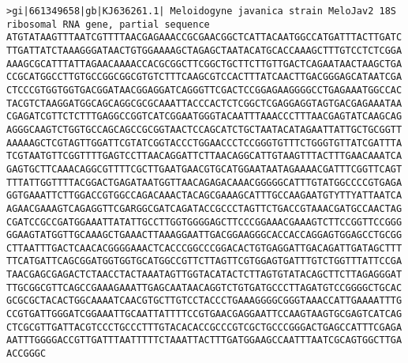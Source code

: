 \documentclass[11pt]{article}
\begin{document}
\begin{Verbatim}[commandchars=\\\{\}]
>gi|661349658|gb|KJ636261.1| Meloidogyne javanica strain MeloJav2 18S ribosomal RNA gene, partial sequence
ATGTATAAGTTTAATCGTTTTAACGAGAAACCGCGAACGGCTCATTACAATGGCCATGATTTACTTGATC
TTGATTATCTAAAGGGATAACTGTGGAAAAGCTAGAGCTAATACATGCACCAAAGCTTTGTCCTCTCGGA
AAAGCGCATTTATTAGAACAAAACCACGCGGCTTCGGCTGCTTCTTGTTGACTCAGAATAACTAAGCTGA
CCGCATGGCCTTGTGCCGGCGGCGTGTCTTTCAAGCGTCCACTTTATCAACTTGACGGGAGCATAATCGA
CTCCCGTGGTGGTGACGGATAACGGAGGATCAGGGTTCGACTCCGGAGAAGGGGCCTGAGAAATGGCCAC
TACGTCTAAGGATGGCAGCAGGCGCGCAAATTACCCACTCTCGGCTCGAGGAGGTAGTGACGAGAAATAA
CGAGATCGTTCTCTTTGAGGCCGGTCATCGGAATGGGTACAATTTAAACCCTTTAACGAGTATCAAGCAG
AGGGCAAGTCTGGTGCCAGCAGCCGCGGTAACTCCAGCATCTGCTAATACATAGAATTATTGCTGCGGTT
AAAAAGCTCGTAGTTGGATTCGTATCGGTACCCTGGAACCCTCCGGGTGTTTCTGGGTGTTATCGATTTA
TCGTAATGTTCGGTTTTGAGTCCTTAACAGGATTCTTAACAGGCATTGTAAGTTTACTTTGAACAAATCA
GAGTGCTTCAAACAGGCGTTTTCGCTTGAATGAACGTGCATGGAATAATAGAAAACGATTTCGGTTCAGT
TTTATTGGTTTTACGGACTGAGATAATGGTTAACAGAGACAAACGGGGGCATTTGTATGGCCCCGTGAGA
GGTGAAATTCTTGGACCGTGGCCAGACAAACTACAGCGAAAGCATTTGCCAAGAATGTYTTYATTAATCA
AGAACGAAAGTCAGAGGTTCGARGGCGATCAGATACCGCCCTAGTTCTGACCGTAAACGATGCCAACTAG
CGATCCGCCGATGGAAATTATATTGCCTTGGTGGGGAGCTTCCCGGAAACGAAAGTCTTCCGGTTCCGGG
GGAAGTATGGTTGCAAAGCTGAAACTTAAAGGAATTGACGGAAGGGCACCACCAGGAGTGGAGCCTGCGG
CTTAATTTGACTCAACACGGGGAAACTCACCCGGCCCGGACACTGTGAGGATTGACAGATTGATAGCTTT
TTCATGATTCAGCGGATGGTGGTGCATGGCCGTTCTTAGTTCGTGGAGTGATTTGTCTGGTTTATTCCGA
TAACGAGCGAGACTCTAACCTACTAAATAGTTGGTACATACTCTTAGTGTATACAGCTTCTTAGAGGGAT
TTGCGGCGTTCAGCCGAAAGAAATTGAGCAATAACAGGTCTGTGATGCCCTTAGATGTCCGGGGCTGCAC
GCGCGCTACACTGGCAAAATCAACGTGCTTGTCCTACCCTGAAAGGGGCGGGTAAACCATTGAAAATTTG
CCGTGATTGGGATCGGAAATTGCAATTATTTTCCGTGAACGAGGAATTCCAAGTAAGTGCGAGTCATCAG
CTCGCGTTGATTACGTCCCTGCCCTTTGTACACACCGCCCGTCGCTGCCCGGGACTGAGCCATTTCGAGA
AATTTGGGGACCGTTGATTTAATTTTTCTAAATTACTTTGATGGAAGCCAATTTAATCGCAGTGGCTTGA
ACCGGGC


\end{Verbatim}
\end{document}
